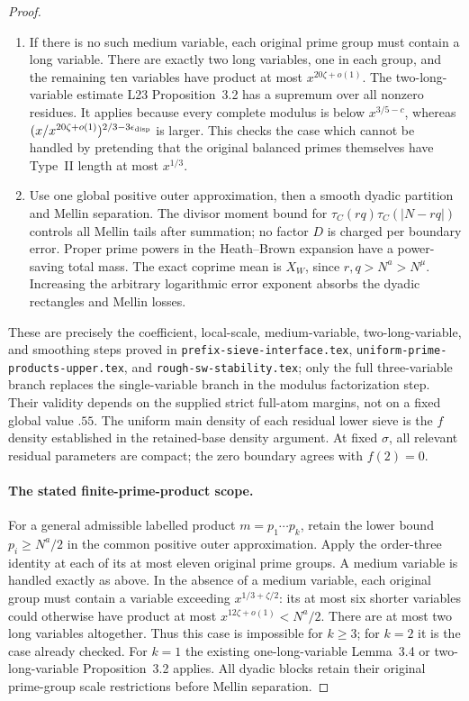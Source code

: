 \documentclass[11pt]{article}
\begin{document}
\begin{proof}
\begin{enumerate}
\item
If there is no such medium variable, each original prime group
must contain a long variable. There are exactly two long
variables, one in each group, and the remaining ten variables
have product at most $x^{20\zeta+o(1)}$. The two-long-variable
estimate L23 Proposition~3.2 has a supremum over all nonzero
residues. It applies because every complete modulus is below
$x^{3/5-c}$, whereas
$(x/x^{20\zeta+o(1)})^{2/3-3\epsilon_{\rm disp}}$ is larger.
This checks the case which cannot be handled by pretending
that the original balanced primes themselves have Type~II
length at most $x^{1/3}$.

\item
Use one global positive outer approximation, then a smooth
dyadic partition and Mellin separation. The divisor moment
bound for $\tau_C(rq)\tau_C(|N-rq|)$ controls all Mellin tails
after summation; no factor $D$ is charged per boundary error.
Proper prime powers in the Heath--Brown expansion have a
power-saving total mass. The exact coprime mean is $X_W$,
since $r,q>N^a>N^\mu$. Increasing the arbitrary logarithmic
error exponent absorbs the dyadic rectangles and Mellin losses.
\end{enumerate}

These are precisely the coefficient, local-scale, medium-variable,
two-long-variable, and smoothing steps proved in
\texttt{prefix-sieve-interface.tex},
\texttt{uniform-prime-products-upper.tex}, and
\texttt{rough-sw-stability.tex}; only the full three-variable
branch replaces the single-variable branch in the modulus
factorization step. Their validity depends on the supplied
strict full-atom margins, not on a fixed global value $.55$.
The uniform main density of each residual lower sieve is the
$f$ density established in the retained-base density argument.
At fixed $\sigma$, all relevant residual parameters are compact;
the zero boundary agrees with $f(2)=0$.

\paragraph{The stated finite-prime-product scope.}
For a general admissible labelled product $m=p_1\cdots p_k$,
retain the lower bound $p_i\ge N^a/2$ in the common positive
outer approximation. Apply the order-three identity at each
of its at most eleven original prime groups. A medium variable
is handled exactly as above. In the absence of a medium
variable, each original group must contain a variable exceeding
$x^{1/3+\zeta/2}$: its at most six shorter variables could
otherwise have product at most $x^{12\zeta+o(1)}<N^a/2$.
There are at most two long variables altogether. Thus this
case is impossible for $k\ge3$; for $k=2$ it is the case
already checked. For $k=1$ the existing one-long-variable
Lemma~3.4 or two-long-variable Proposition~3.2 applies.
All dyadic blocks retain their original prime-group scale
restrictions before Mellin separation.


\end{proof}
\end{document}
